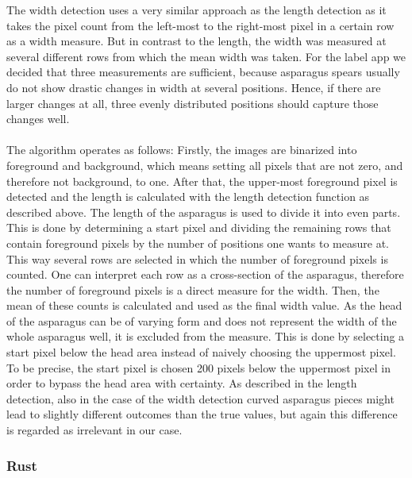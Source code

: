 The width detection uses a very similar approach as the length detection as it takes the pixel count from the left-most to the right-most  pixel in a certain row as a width measure. But in contrast to the length, the width was measured at several different rows from which the mean width was taken. For the label app we decided that three measurements are sufficient, because asparagus spears usually do not show drastic changes in width at several positions. Hence, if there are larger changes at all, three evenly distributed positions should capture those changes well. \\
\\
The algorithm operates as follows: Firstly, the images are binarized into foreground and background, which means setting all pixels that are not zero, and therefore not background, to one. After that, the upper-most foreground pixel is detected and the length is calculated with the length detection function as described above. The length of the asparagus is used to divide it into even parts. This is done by determining a start pixel and dividing the remaining rows that contain foreground pixels by the number of positions one wants to measure at. This way several rows are selected in which the number of foreground pixels is counted. One can interpret each row as a cross-section of the asparagus, therefore the number of foreground pixels is a direct measure for the width. Then, the mean of these counts is calculated and used as the final width value. As the head of the asparagus can be of varying form and does not represent the width of the whole asparagus well, it is excluded from the measure. This is done by selecting a start pixel below the head area instead of naively choosing the uppermost pixel. To be precise, the start pixel is chosen 200 pixels below the uppermost pixel in order to bypass the head area with certainty. As described in the length detection, also in the case of the width detection curved asparagus pieces might lead to slightly different outcomes than the true values, but again this difference is regarded as irrelevant in our case.

\subsubsection{Rust}

